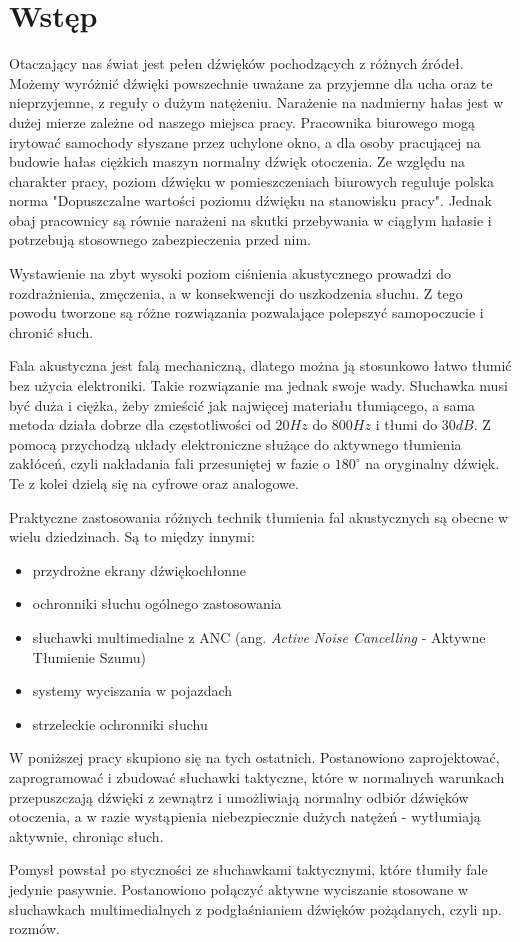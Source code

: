 \chapter{Wstęp}
\label{cha:wstep}

Otaczający nas świat jest pełen dźwięków pochodzących z różnych źródeł. Możemy wyróżnić dźwięki powszechnie uważane za przyjemne dla ucha oraz te nieprzyjemne, z reguły o dużym natężeniu. Narażenie na nadmierny hałas jest w dużej mierze zależne od naszego miejsca pracy. Pracownika biurowego mogą irytować samochody słyszane przez uchylone okno, a dla osoby pracującej na budowie hałas ciężkich maszyn normalny dźwięk otoczenia. Ze względu na charakter pracy, poziom dźwięku w pomieszczeniach biurowych reguluje polska norma "Dopuszczalne wartości poziomu dźwięku na stanowisku pracy"\cite{PolskaNormaCisnienia}. Jednak obaj pracownicy są równie narażeni na skutki przebywania w ciągłym hałasie i potrzebują stosownego zabezpieczenia przed nim.

Wystawienie na zbyt wysoki poziom ciśnienia akustycznego prowadzi do rozdrażnienia, zmęczenia, a w konsekwencji do uszkodzenia słuchu. Z tego powodu tworzone są różne rozwiązania pozwalające polepszyć samopoczucie i chronić słuch. 

Fala akustyczna jest falą mechaniczną, dlatego można ją stosunkowo łatwo tłumić bez użycia elektroniki. Takie rozwiązanie ma jednak swoje wady. Słuchawka musi być duża i ciężka, żeby zmieścić jak najwięcej materiału tłumiącego, a sama metoda działa dobrze dla częstotliwości od $ 20Hz $ do $ 800Hz $ i tłumi do $ 30dB $\cite{SennheiserANC}. Z pomocą przychodzą układy elektroniczne służące do aktywnego tłumienia zakłóceń, czyli nakładania fali przesuniętej w fazie o $180^\circ$ na oryginalny dźwięk. Te z kolei dzielą się na cyfrowe oraz analogowe. 

Praktyczne zastosowania różnych technik tłumienia fal akustycznych są obecne w wielu dziedzinach. Są to między innymi:
\begin{itemize}
	\item przydrożne ekrany dźwiękochłonne
	\item ochronniki słuchu ogólnego zastosowania
	\item słuchawki multimedialne z ANC (ang. \textit{Active Noise Cancelling} - Aktywne Tłumienie Szumu)
	\item systemy wyciszania w pojazdach
	\item strzeleckie ochronniki słuchu
\end{itemize}

W poniższej pracy skupiono się na tych ostatnich. Postanowiono zaprojektować, zaprogramować i zbudować słuchawki taktyczne, które w normalnych warunkach przepuszczają dźwięki z zewnątrz i umożliwiają normalny odbiór dźwięków otoczenia, a w razie wystąpienia niebezpiecznie dużych natężeń - wytłumiają aktywnie, chroniąc słuch.

Pomysł powstał po styczności ze słuchawkami taktycznymi, które tłumiły fale jedynie pasywnie. Postanowiono połączyć aktywne wyciszanie stosowane w słuchawkach multimedialnych z podgłaśnianiem dźwięków pożądanych, czyli np. rozmów.